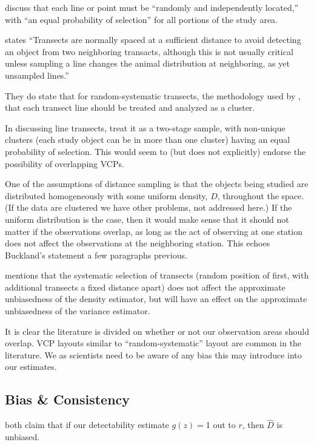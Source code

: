 \documentclass[12pt]{article}
\begin{document}
\textcite{buckland2001} discuss that each line or point must be ``randomly and independently located,'' with ``an equal probability of selection'' for all portions of the study area.

\textcite{buckland2001} states ``Transects are normally spaced at a sufficient distance to avoid detecting an object from two neighboring transacts, although this is not usually critical unless sampling a line changes the animal distribution at neighboring, as yet unsampled lines.''

They do state that for random-systematic transects, the methodology used by \textcite{micronesian}, that each transect line should be treated and analyzed as a cluster.

In discussing line transects, \textcite{barry2001} treat it as a two-stage sample, with non-unique clusters (each study object can be in more than one cluster) having an equal probability of selection. This would seem to (but does not explicitly) endorse the possibility of overlapping VCPs. 

One of the assumptions of distance sampling is that the objects being studied are distributed homogeneously with some uniform density, $D$, throughout the space. \parencite{ramsey1981} (If the data are clustered we have other problems, not addressed here.) If the uniform distribution is the case, then it would make sense that it should not matter if the observations overlap, as long as the act of observing at one station does not affect the observations at the neighboring station. This echoes Buckland’s statement a few paragraphs previous.

\textcite{thompson2012} mentions that the systematic selection of transects (random position of first, with additional transects a fixed distance apart) does not affect the approximate unbiasedness of the density estimator, but will have an effect on the approximate unbiasedness of the variance estimator. 

It is clear the literature is divided on whether or not our observation areas should overlap. VCP layouts similar to \textcite{micronesian} ``random-systematic'' layout are common in the literature. We as scientists need to be aware of any bias this may introduce into our estimates.

\subsection{Bias \& Consistency}
\textcite{buckland2001,ramsey1979} both claim that if our detectability estimate $g(z)=$1 out to $r$, then $\hat{D}$ is unbiased. 
\end{document}
